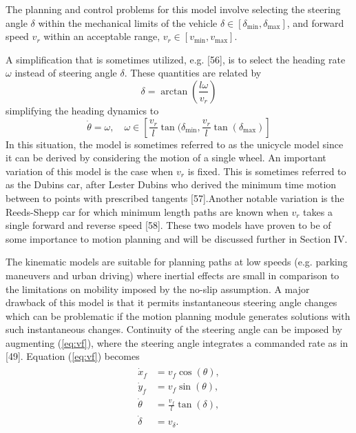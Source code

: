 The planning and control problems for this model involve selecting the steering angle $\delta$ within the mechanical limits of the vehicle $\delta\in [\delta_{\min}, \delta_{\max}]$, and forward speed $v_r$ within an acceptable range, $v_r\in [v_{\min}, v_{\max}]$.

A simplification that is sometimes utilized, e.g. [56], is to select the heading rate $\omega$ instead of steering angle $\delta$. These quantities are related by
\begin{equation}
\delta=\arctan(\frac{l\omega}{v_r})
\end{equation}
simplifying the heading dynamics to
\begin{equation}
\dot{\theta}=\omega, \quad \omega\in [\frac{v_r}{l}\tan(\delta_{\min}, \frac{v_r}{l}\tan(\delta_{\max})]
\end{equation}
In this situation, the model is sometimes referred to as the unicycle model since it can be derived by considering the motion of a single wheel. An important variation of this model is the case when $v_r$ is fixed. This is sometimes referred to as the Dubins car, after Lester Dubins who derived the minimum time motion between to points with prescribed tangents [57].Another notable variation is the Reeds-Shepp car for which minimum length paths are known when $v_r$ takes a single forward and reverse speed [58]. These two models have proven to be of some importance to motion planning and will be discussed further in Section IV.

The kinematic models are suitable for planning paths at low speeds (e.g. parking maneuvers and urban driving) where inertial effects are small in comparison to the limitations on mobility imposed by the no-slip assumption. A major drawback of this model is that it permits instantaneous steering angle changes which can be problematic if the motion planning module generates solutions with such instantaneous changes. Continuity of the steering angle can be imposed by augmenting (\ref{eq:vf}), where the steering angle integrates a commanded rate as in [49]. Equation (\ref{eq:vf}) becomes
\begin{align}
\begin{split}
\dot{x}_f&= v_f\cos(\theta),\\
\dot{y}_f&= v_f\sin(\theta),\\
\dot{\theta}&=\frac{v_f}{l}\tan(\delta),\\
\dot{\delta}&=v_{\delta}.
\end{split}
\end{align}

